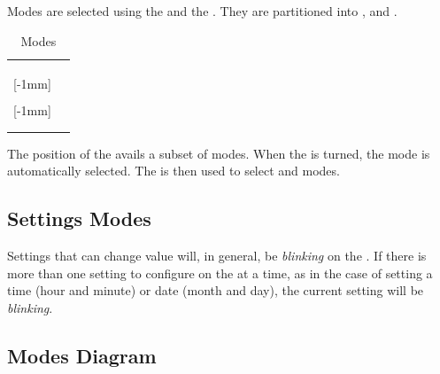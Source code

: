 Modes are selected using the  and the .  They are partitioned
into ,  and .

\begin{table}[H]
\centering
\begin{tabu} { X[1,c,m] | X[1,c,m] }
  \thrule

  & \hyperref[Clock]{} \\
  \hyperref[Primary Modes]{} & \hyperref[Set Alarm]{} \\
  & \hyperref[Timer]{} \\ \mrule

  [-1mm]{\hyperref[Secondary Modes]{}}
    & \hyperref[Set Clock]{} \\
  & \hyperref[Power Settings]{} \\ \mrule

  [-1mm]{\hyperref[Tertiary Modes]{}}
    & \hyperref[Touch Settings]{} \\
  & \hyperref[Set Night Light]{} \\
  \bhrule
\end{tabu}
\caption {Modes}
\end{table}

The position of the  avails a subset of modes.  When the  is
turned, the  mode is automatically selected.  The  is then used
to select  and  modes.

\subsection{Settings Modes}

Settings that can change value will, in general, be \textit{blinking} on the
. If there is more than one setting to configure on the  at a time,
as in the case of setting a time (hour and minute) or date (month and day), the
current setting will be \textit{blinking}.

\subsection{Modes Diagram}

